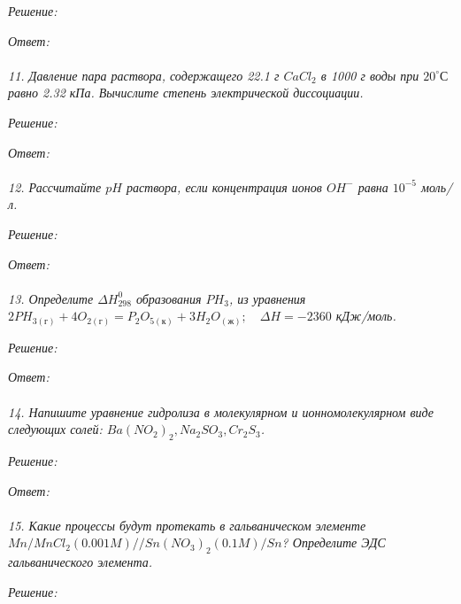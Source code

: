 \emph{Решение:}

\emph{Ответ: } \\\\


\emph{11. Давление пара раствора, содержащего 22.1 г \( CaCl_2 \) в 
1000 г воды при \( 20 ^{\circ}С \) равно 2.32 кПа. Вычислите степень 
электрической диссоциации.}

\emph{Решение:}

\emph{Ответ: } \\\\


\emph{12. Рассчитайте \( pH \) раствора, если концентрация ионов 
\( OH^{-} \) равна \( 10^{-5} \) моль/л.}

\emph{Решение:}

\emph{Ответ: } \\\\


\emph{13. Определите \( \Delta H^{0}_{298} \) образования \( PH_3\), 
из уравнения 
\(
    2PH_{3(\text{г})} + 4O_{2(\text{г})} = 
    P_2 O_{5(\text{к})} + 3H_2 O_{(\text{ж})};\quad
    \Delta H = -2360 
\) кДж/моль.}

\emph{Решение:}

\emph{Ответ: } \\\\


\emph{14. Напишите уравнение гидролиза в молекулярном и 
ионномолекулярном виде следующих солей: 
\( Ba(NO_2)_2, Na_2 SO_3, Cr_2 S_3 \).}

\emph{Решение:}

\emph{Ответ: } \\\\


\emph{15. Какие процессы будут протекать в гальваническом элементе 
\( Mn/MnCl_2(0.001 M)//Sn(NO_3)_2(0.1 M)/Sn \)? 
Определите ЭДС гальванического элемента.}

\emph{Решение:}

